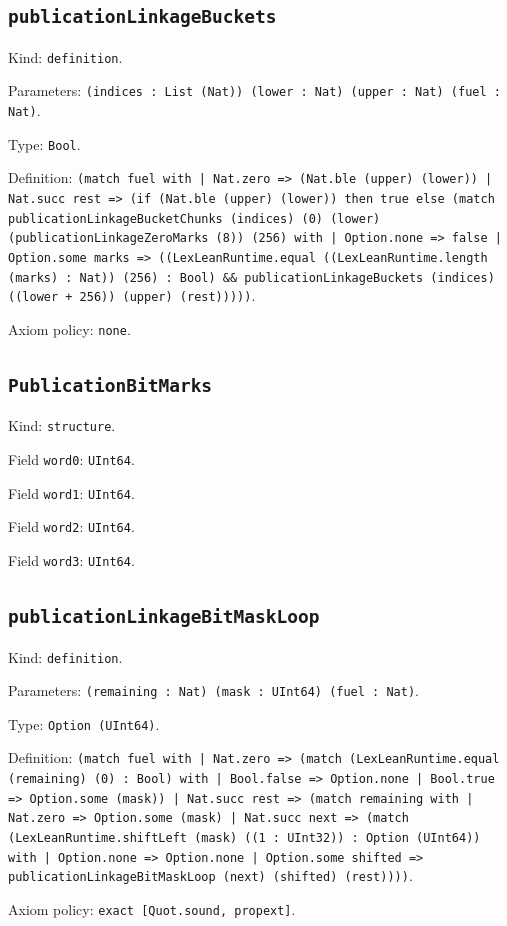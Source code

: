 \documentclass[11pt]{article}
\begin{document}
\subsection*{\texttt{publicationLinkageBuckets}}
\noindent Kind: \texttt{definition}.\par
\noindent Parameters: \texttt{(indices : List (Nat)) (lower : Nat) (upper : Nat) (fuel : Nat)}.\par
\noindent Type: \texttt{Bool}.\par
\noindent Definition: \texttt{(match fuel with | Nat.zero => (Nat.ble (upper) (lower)) | Nat.succ rest => (if (Nat.ble (upper) (lower)) then true else (match publicationLinkageBucketChunks (indices) (0) (lower) (publicationLinkageZeroMarks (8)) (256) with | Option.none => false | Option.some marks => ((LexLeanRuntime.equal ((LexLeanRuntime.length (marks) : Nat)) (256) : Bool) \&\& publicationLinkageBuckets (indices) ((lower + 256)) (upper) (rest)))))}.\par
\noindent Axiom policy: \texttt{none}.\par
\subsection*{\texttt{PublicationBitMarks}}
\noindent Kind: \texttt{structure}.\par
\noindent Field \texttt{word0}: \texttt{UInt64}.\par
\noindent Field \texttt{word1}: \texttt{UInt64}.\par
\noindent Field \texttt{word2}: \texttt{UInt64}.\par
\noindent Field \texttt{word3}: \texttt{UInt64}.\par
\subsection*{\texttt{publicationLinkageBitMaskLoop}}
\noindent Kind: \texttt{definition}.\par
\noindent Parameters: \texttt{(remaining : Nat) (mask : UInt64) (fuel : Nat)}.\par
\noindent Type: \texttt{Option (UInt64)}.\par
\noindent Definition: \texttt{(match fuel with | Nat.zero => (match (LexLeanRuntime.equal (remaining) (0) : Bool) with | Bool.false => Option.none | Bool.true => Option.some (mask)) | Nat.succ rest => (match remaining with | Nat.zero => Option.some (mask) | Nat.succ next => (match (LexLeanRuntime.shiftLeft (mask) ((1 : UInt32)) : Option (UInt64)) with | Option.none => Option.none | Option.some shifted => publicationLinkageBitMaskLoop (next) (shifted) (rest))))}.\par
\noindent Axiom policy: \texttt{exact [Quot.sound, propext]}.\par
\end{document}
